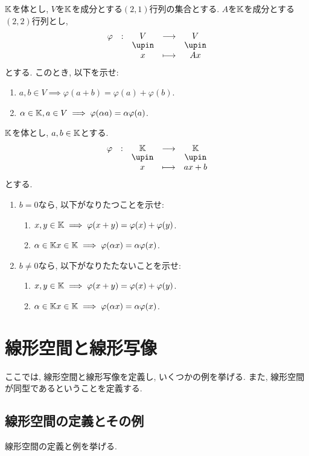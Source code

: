 \begin{quiz}
  $\mathbb{K}$を体とし, $V$を$\mathbb{K}$を成分とする$(2,1)$行列の集合とする.
  $A$を$\mathbb{K}$を成分とする$(2,2)$行列とし,
  \begin{align*}
    \shazo{\varphi}{V}{V}{x}{Ax}
  \end{align*}
  とする.
  このとき, 以下を示せ:
  \begin{enumerate}
    \item $a,b\in V\implies \varphi(a+b)=\varphi(a)+\varphi(b)$.
    \item $\alpha\in\mathbb{K}, a\in V\implies \varphi(\alpha a)=\alpha\varphi(a)$.
  \end{enumerate}
\end{quiz}

\begin{quiz}
  $\mathbb{K}$を体とし, $a, b\in \mathbb{K}$とする.
  \begin{align*}
    \shazo{\varphi}{\KK}{\KK}{x}{ax+b}
  \end{align*}
  とする.
  \begin{enumerate}
  \item
  $b=0$なら, 以下がなりたつことを示せ:
  \begin{enumerate}
    \item $x,y\in \mathbb{K}\implies \varphi(x+y)=\varphi(x)+\varphi(y)$.
    \item $\alpha\in\mathbb{K} x\in \mathbb{K}\implies \varphi(\alpha x)=\alpha\varphi(x)$.
  \end{enumerate}
  \item
  $b\neq 0$なら, 以下がなりたたないことを示せ:
  \begin{enumerate}
    \item $x,y\in \mathbb{K}\implies \varphi(x+y)=\varphi(x)+\varphi(y)$.
    \item $\alpha\in\mathbb{K} x\in \mathbb{K}\implies \varphi(\alpha x)=\alpha\varphi(x)$.
  \end{enumerate}
  \end{enumerate}
\end{quiz}


\chapter{線形空間と線形写像}
ここでは, 線形空間と線形写像を定義し,
いくつかの例を挙げる.
また, 線形空間が同型であるということを定義する.

\section{線形空間の定義とその例}
線形空間の定義と例を挙げる.

